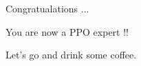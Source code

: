 \documentclass[aspectratio=169]{beamer}
\begin{document}

\begin{frame}{Congratualations ...}

\Huge{You are now a PPO expert !!} 
\vspace{1cm}

\Huge{\hspace{2cm} Let's go and drink some coffee.}

\end{frame}

\appendix
\end{document}
